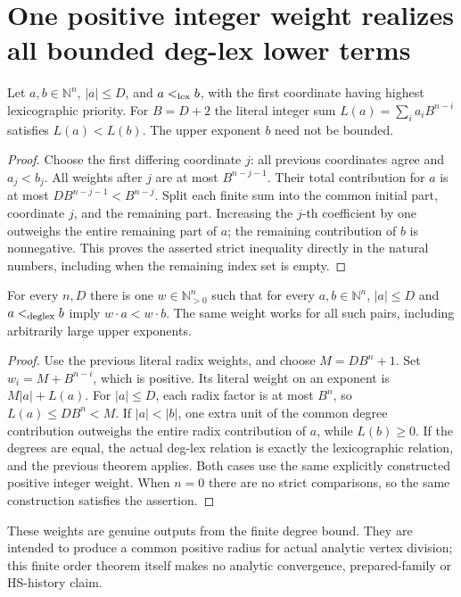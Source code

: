 \section{One positive integer weight realizes all bounded deg-lex lower terms}

\begin{theorem}
\label{hir:actual-bounded-lex-radix-weight}
Let $a,b\in\mathbb N^n$, $|a|\leq D$, and $a<_{\rm lex}b$,
with the first coordinate having highest lexicographic priority.
For $B=D+2$ the literal integer sum
$L(a)=\sum_i a_i B^{n-i}$ satisfies $L(a)<L(b)$.
The upper exponent $b$ need not be bounded.
\leanok
\end{theorem}
\begin{proof}
Choose the first differing coordinate $j$: all previous coordinates
agree and $a_j<b_j$. All weights after $j$ are at most
$B^{n-j-1}$. Their total contribution for $a$ is at most
$D B^{n-j-1}<B^{n-j}$. Split each finite sum into the common
initial part, coordinate $j$, and the remaining part. Increasing
the $j$-th coefficient by one outweighs the entire remaining part
of $a$; the remaining contribution of $b$ is nonnegative.
This proves the asserted strict inequality directly in the natural
numbers, including when the remaining index set is empty.
\end{proof}

\begin{theorem}
\label{hir:actual-deg-lex-positive-integer-weights}
For every $n,D$ there is one $w\in\mathbb N_{>0}^n$ such that
for every $a,b\in\mathbb N^n$, $|a|\leq D$ and
$a<_{\rm deglex}b$ imply $w\cdot a<w\cdot b$.
The same weight works for all such pairs, including arbitrarily
large upper exponents.
\leanok
\end{theorem}
\begin{proof}
Use the previous literal radix weights, and choose
$M=D B^n+1$. Set $w_i=M+B^{n-i}$, which is positive.
Its literal weight on an exponent is $M|a|+L(a)$.
For $|a|\leq D$, each radix factor is at most $B^n$, so
$L(a)\leq D B^n<M$. If $|a|<|b|$, one extra unit of
the common degree contribution outweighs the entire radix
contribution of $a$, while $L(b)\geq0$. If the degrees are equal,
the actual deg-lex relation is exactly the lexicographic relation,
and the previous theorem applies. Both cases use the same explicitly
constructed positive integer weight. When $n=0$ there are no strict
comparisons, so the same construction satisfies the assertion.
\end{proof}

These weights are genuine outputs from the finite degree bound. They
are intended to produce a common positive radius for actual analytic
vertex division; this finite order theorem itself makes no analytic
convergence, prepared-family or HS-history claim.
